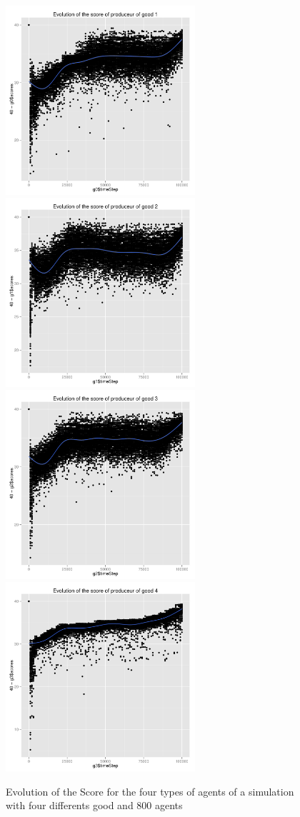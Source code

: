 \documentclass{wscpaperproc}
\begin{document}
\begin{figure}[htp]
	\begin{center}
		\includegraphics[width=7cm]{img/scatterPlotGood1.pdf}
		\includegraphics[width=7cm]{img/scatterPlotGood2.pdf}
		\includegraphics[width=7cm]{img/scatterPlotGood3.pdf}
		\includegraphics[width=7cm]{img/scatterPlotGood4.pdf}
	\end{center}
	\caption{Evolution of the Score for the four types of agents of a simulation with four differents good and 800 agents}
	\label{fig:suboptimal}
\end{figure}
\end{document}

